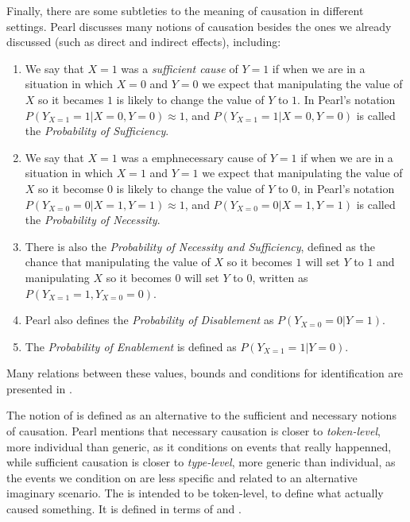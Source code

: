 Finally, there are some subtleties to the meaning of causation in different settings. Pearl discusses many notions of causation besides the ones we already discussed (such as direct and indirect effects), including:

\begin{enumerate}
\item We say that $X=1$ was a \emph{sufficient cause} of $Y=1$ if when we are in a situation in which $X=0$ and $Y=0$ we expect that manipulating the value of $X$ so it becames $1$ is likely to change the value of $Y$ to $1$. In Pearl's notation $P(Y_{X=1}=1 | X=0, Y=0) \approx 1$, and $P(Y_{X=1}=1 | X=0, Y=0)$ is called the \emph{Probability of Sufficiency}.
\item We say that $X=1$ was a emph{necessary cause} of $Y=1$ if when we are in a situation in which $X=1$ and $Y=1$ we expect that manipulating the value of $X$ so it becomse $0$ is likely to change the value of $Y$ to $0$, in Pearl's notation $P(Y_{X=0}=0 | X = 1, Y = 1) \approx 1$, and $P(Y_{X=0}=0 | X = 1, Y = 1)$ is called the \emph{Probability of Necessity}.
\item There is also the \emph{Probability of Necessity and Sufficiency}, defined as the chance that manipulating the value of $X$ so it becomes $1$ will set $Y$ to $1$ and manipulating $X$ so it becomes $0$ will set $Y$ to $0$, written as $P(Y_{X=1}=1,Y_{X=0}=0)$. 
\item Pearl also defines the \emph{Probability of Disablement} as $P(Y_{X=0}=0|Y=1)$.
\item The \emph{Probability of Enablement} is defined as $P(Y_{X=1}=1|Y=0)$. 
\end{enumerate}

Many relations between these values, bounds and conditions for identification are presented in \cite[Chapter~9]{Causality}.

The notion of  is defined as an alternative to the sufficient and necessary notions of causation. Pearl mentions that necessary causation is closer to \emph{token-level}, more individual than generic, as it conditions on events that really happenned, while sufficient causation is closer to \emph{type-level}, more generic than individual, as the events we condition on are less specific and related to an alternative imaginary scenario. The  is intended to be token-level, to define what actually caused something. It is defined in terms of  and . 

